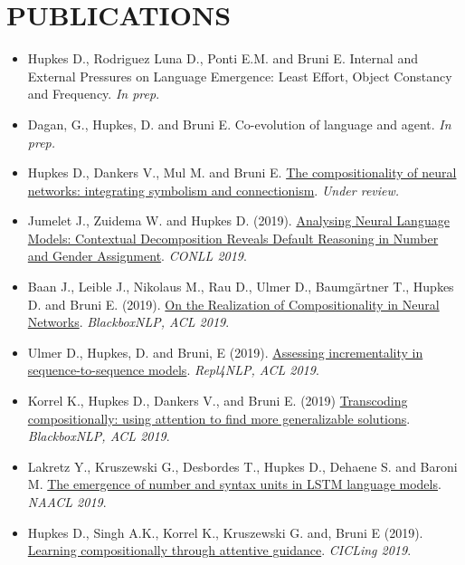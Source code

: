 \section{PUBLICATIONS}

\begin{itemize}
\setlength\itemsep{5pt}
    \item Hupkes D., Rodriguez Luna D., Ponti E.M. and Bruni E. Internal and External Pressures on Language Emergence:
Least Effort, Object Constancy and Frequency. \textit{In prep}.
    \item Dagan, G., Hupkes, D. and Bruni E. Co-evolution of language and agent. \textit{In prep.}
    \item Hupkes D., Dankers V., Mul M. and Bruni E. \href{https://arxiv.org/pdf/1908.08351.pdf}{The compositionality of neural networks: integrating symbolism and connectionism}. \textit{Under review.}
    
    \item Jumelet J., Zuidema W. and Hupkes D. (2019). \href{https://arxiv.org/pdf/1909.08975.pdf}{Analysing Neural Language Models: Contextual Decomposition Reveals Default Reasoning in Number and Gender Assignment}. \textit{CONLL 2019}.
    
    \item Baan J., Leible J., Nikolaus M., Rau D., Ulmer D., Baumgärtner T., Hupkes D. and Bruni E. (2019). \href{https://www.aclweb.org/anthology/W19-4814}{On the Realization of Compositionality in Neural Networks}. \textit{BlackboxNLP, ACL 2019}. 
    
    \item Ulmer D., Hupkes, D. and Bruni, E (2019). \href{https://www.aclweb.org/anthology/W19-4324}{Assessing incrementality in sequence-to-sequence models}. \textit{Repl4NLP, ACL 2019}. 
    
    \item Korrel K., Hupkes D., Dankers V., and Bruni E. (2019) \href{https://www.aclweb.org/anthology/W19-4801}{Transcoding compositionally: using attention to find more generalizable solutions}. \textit{BlackboxNLP, ACL 2019}.
    
    \item Lakretz Y., Kruszewski G., Desbordes T., Hupkes D., Dehaene S. and Baroni M. \href{https://www.aclweb.org/anthology/N19-1002}{The emergence of number and syntax units in LSTM language models}. \textit{NAACL 2019}.

    \item  Hupkes D., Singh A.K., Korrel K., Kruszewski G. and, Bruni E (2019). \href{https://arxiv.org/abs/1805.09657}{Learning compositionally through attentive guidance}. \textit{CICLing 2019}.
    

\end{itemize}
